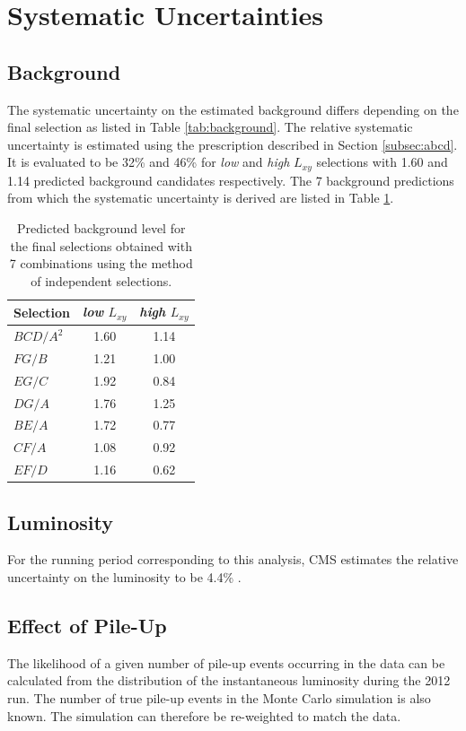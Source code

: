 \section{Systematic Uncertainties}
\label{sec:systematics}

\subsection{Background}
The systematic uncertainty on the estimated background differs depending on the final selection
 as listed in Table \ref{tab:background}. The relative systematic uncertainty is estimated using the prescription
described in Section \ref{subsec:abcd}. It is evaluated to be 32\% and 46\%
for {\it low} and {\it high} $L_{xy}$ selections with 1.60 and 1.14 predicted background candidates respectively. 
The 7 background predictions from which the systematic uncertainty is derived are listed in Table \ref{tab:sigbkg}.

\begin{table}[htbp]
\centering
\caption{Predicted background level for the final selections obtained with 7 combinations using the
method of independent selections. \label{tab:sigbkg}}

\begin{tabular}{lcc}

\hline
Selection & {\it low} $L_{xy} $& {\it high} $L_{xy}$ \\
\hline
$BCD/A^2$ & 1.60 & 1.14 \\
$FG/B$ & 1.21 & 1.00 \\
$EG/C$ & 1.92 & 0.84 \\
$DG/A$ & 1.76 & 1.25 \\
$BE/A$ & 1.72 & 0.77 \\
$CF/A$ & 1.08 & 0.92 \\
$EF/D$ & 1.16 & 0.62 \\
\hline

\end{tabular}
\end{table} 


\subsection{Luminosity}
For the running period corresponding to this analysis, CMS estimates the relative uncertainty on the luminosity to be 4.4\% \cite{CMS-PAS-LUM-12-001}.

\subsection{Effect of Pile-Up}
The likelihood of a given number of pile-up events occurring in the data can be calculated from the distribution
 of the instantaneous luminosity during the 2012 run. The number of true pile-up events in the Monte Carlo
 simulation is also known. The simulation can therefore be re-weighted to match the data. 

